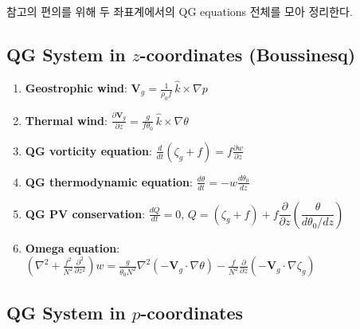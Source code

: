 참고의 편의를 위해 두 좌표계에서의 QG equations 전체를 모아 정리한다.

\subsection{QG System in $z$-coordinates (Boussinesq)}

\begin{enumerate}
  \item \textbf{Geostrophic wind}:
    $\displaystyle \mathbf{V}_g = \frac{1}{\rho_0 f}\,\hat{k}\times\nabla p$

  \item \textbf{Thermal wind}:
    $\displaystyle \frac{\partial\mathbf{V}_g}{\partial z}
    = \frac{g}{f\theta_0}\,\hat{k}\times\nabla\theta$

  \item \textbf{QG vorticity equation}:
    $\displaystyle \frac{d}{dt}(\zeta_g + f) = f\frac{\partial w}{\partial z}$

  \item \textbf{QG thermodynamic equation}:
    $\displaystyle \frac{d\theta}{dt} = -w\frac{d\theta_0}{dz}$

  \item \textbf{QG PV conservation}:
    $\displaystyle \frac{dQ}{dt} = 0$,
    \quad $Q = (\zeta_g + f) + f\dfrac{\partial}{\partial z}
    \!\left(\dfrac{\theta}{d\theta_0/dz}\right)$

  \item \textbf{Omega equation}:
    $\displaystyle \left(\nabla^2 + \frac{f^2}{N^2}
    \frac{\partial^2}{\partial z^2}\right) w
    = \frac{g}{\theta_0 N^2}\nabla^2(-\mathbf{V}_g\cdot\nabla\theta)
    - \frac{f}{N^2}\frac{\partial}{\partial z}
    (-\mathbf{V}_g\cdot\nabla\zeta_g)$
\end{enumerate}

\subsection{QG System in $p$-coordinates}

